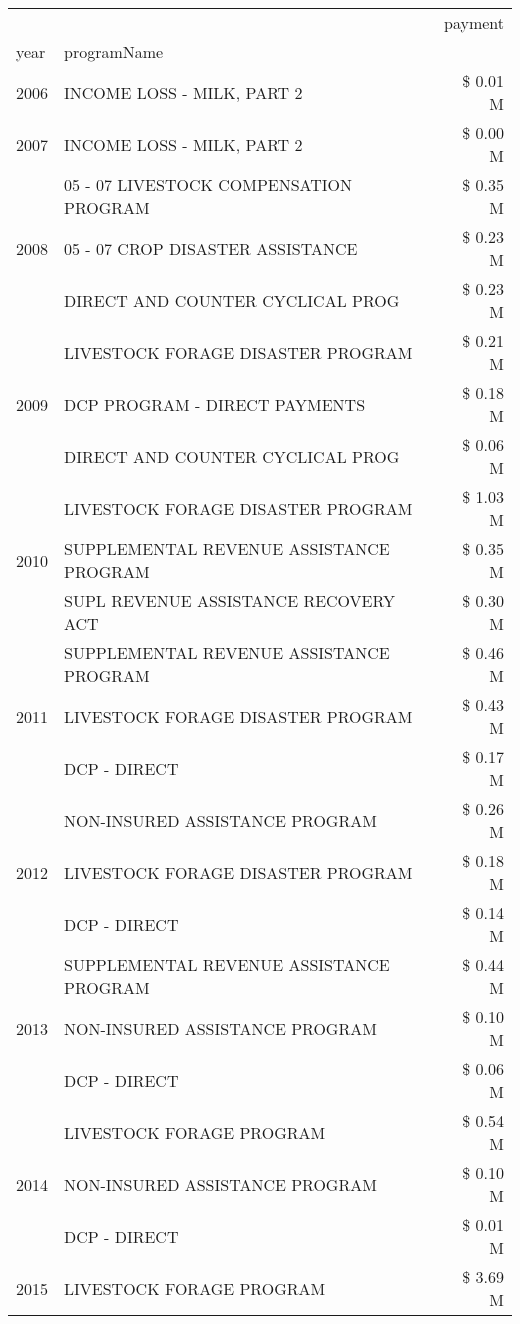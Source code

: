 \begin{tabular}{llr}
\toprule
 &  & payment \\
year & programName &  \\
\midrule
2006 & INCOME LOSS - MILK, PART 2 & \$ 0.01 M \\
\cline{1-3}
2007 & INCOME LOSS - MILK, PART 2 & \$ 0.00 M \\
\cline{1-3}
\multirow[t]{3}{*}{2008} & 05 - 07 LIVESTOCK COMPENSATION PROGRAM & \$ 0.35 M \\
 & 05 - 07 CROP DISASTER ASSISTANCE & \$ 0.23 M \\
 & DIRECT AND COUNTER CYCLICAL PROG & \$ 0.23 M \\
\cline{1-3}
\multirow[t]{3}{*}{2009} & LIVESTOCK FORAGE DISASTER  PROGRAM & \$ 0.21 M \\
 & DCP PROGRAM - DIRECT PAYMENTS & \$ 0.18 M \\
 & DIRECT AND COUNTER CYCLICAL PROG & \$ 0.06 M \\
\cline{1-3}
\multirow[t]{3}{*}{2010} & LIVESTOCK FORAGE DISASTER  PROGRAM & \$ 1.03 M \\
 & SUPPLEMENTAL REVENUE ASSISTANCE PROGRAM & \$ 0.35 M \\
 & SUPL REVENUE ASSISTANCE RECOVERY ACT & \$ 0.30 M \\
\cline{1-3}
\multirow[t]{3}{*}{2011} & SUPPLEMENTAL REVENUE ASSISTANCE PROGRAM & \$ 0.46 M \\
 & LIVESTOCK FORAGE DISASTER PROGRAM & \$ 0.43 M \\
 & DCP - DIRECT & \$ 0.17 M \\
\cline{1-3}
\multirow[t]{3}{*}{2012} & NON-INSURED ASSISTANCE PROGRAM & \$ 0.26 M \\
 & LIVESTOCK FORAGE DISASTER PROGRAM & \$ 0.18 M \\
 & DCP - DIRECT & \$ 0.14 M \\
\cline{1-3}
\multirow[t]{3}{*}{2013} & SUPPLEMENTAL REVENUE ASSISTANCE PROGRAM & \$ 0.44 M \\
 & NON-INSURED ASSISTANCE PROGRAM & \$ 0.10 M \\
 & DCP - DIRECT & \$ 0.06 M \\
\cline{1-3}
\multirow[t]{3}{*}{2014} & LIVESTOCK FORAGE PROGRAM & \$ 0.54 M \\
 & NON-INSURED ASSISTANCE PROGRAM & \$ 0.10 M \\
 & DCP - DIRECT & \$ 0.01 M \\
\cline{1-3}
\multirow[t]{3}{*}{2015} & LIVESTOCK FORAGE PROGRAM & \$ 3.69 M \\

\end{tabular}
